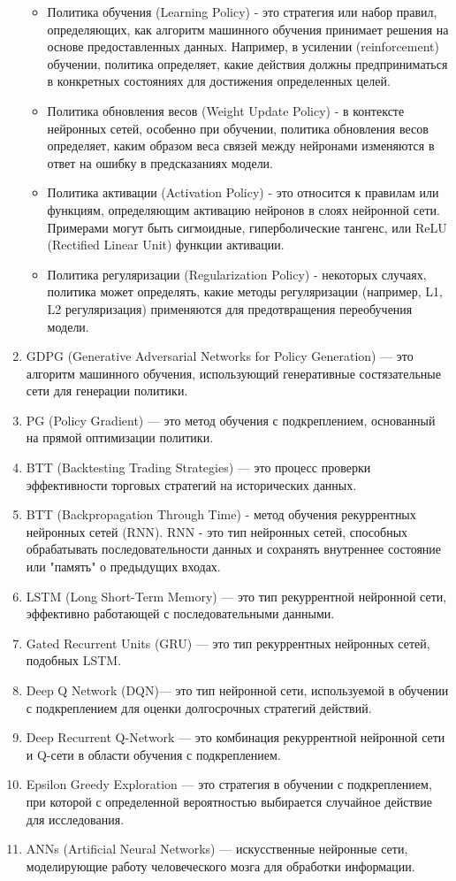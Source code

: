 \documentclass[a4paper,14pt]{extarticle}
\begin{document}
\begin{enumerate}
\begin{itemize}
\item Политика обучения (Learning Policy) - это стратегия или набор правил, определяющих, как алгоритм машинного обучения принимает решения на основе предоставленных данных. Например, в усилении (reinforcement) обучении, политика определяет, какие действия должны предприниматься в конкретных состояниях для достижения определенных целей.
\item Политика обновления весов (Weight Update Policy) -  в контексте нейронных сетей, особенно при обучении, политика обновления весов определяет, каким образом веса связей между нейронами изменяются в ответ на ошибку в предсказаниях модели.
\item Политика активации (Activation Policy) - это относится к правилам или функциям, определяющим активацию нейронов в слоях нейронной сети. Примерами могут быть сигмоидные, гиперболические тангенс, или ReLU (Rectified Linear Unit) функции активации.
\item Политика регуляризации (Regularization Policy) -  некоторых случаях, политика может определять, какие методы регуляризации (например, L1, L2 регуляризация) применяются для предотвращения переобучения модели.
\end{itemize}

\item GDPG (Generative Adversarial Networks for Policy Generation) — это алгоритм машинного обучения, использующий генеративные состязательные сети для генерации политики.
\item PG (Policy Gradient) — это метод обучения с подкреплением, основанный на прямой оптимизации политики.
\item BTT (Backtesting Trading Strategies) — это процесс проверки эффективности торговых стратегий на исторических данных.
\item BTT (Backpropagation Through Time) - метод обучения рекуррентных нейронных сетей (RNN). RNN - это тип нейронных сетей, способных обрабатывать последовательности данных и сохранять внутреннее состояние или "память" о предыдущих входах.
\item LSTM (Long Short-Term Memory) — это тип рекуррентной нейронной сети, эффективно работающей с последовательными данными.
\item Gated Recurrent Units (GRU) — это тип рекуррентных нейронных сетей, подобных LSTM.
\item Deep Q Network (DQN)— это тип нейронной сети, используемой в обучении с подкреплением для оценки долгосрочных стратегий действий.
\item Deep Recurrent Q-Network — это комбинация рекуррентной нейронной сети и Q-сети в области обучения с подкреплением.
\item Epsilon Greedy Exploration — это стратегия в обучении с подкреплением, при которой с определенной вероятностью выбирается случайное действие для исследования.
\item ANNs (Artificial Neural Networks) — искусственные нейронные сети, моделирующие работу человеческого мозга для обработки информации.
\end{enumerate}
\newpage 
\end{document}
